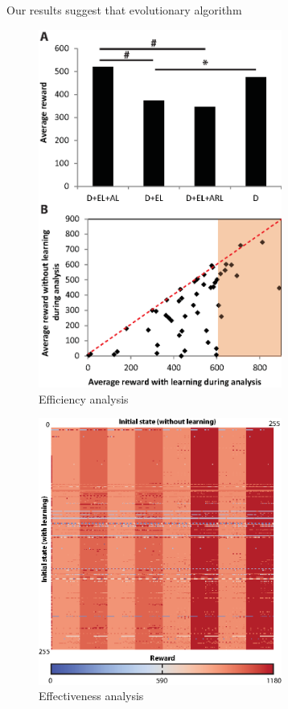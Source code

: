 \documentclass[letterpaper]{article}
\begin{document}
Our results suggest that evolutionary algorithm  

\begin{figure}[!t]
\begin{center}
\includegraphics[width=8cm]{Fig2_Efficiency_analysis.eps}
\caption{Efficiency analysis}
\label{Efficiency_analysis}
\end{center}
\end{figure}

\begin{figure}[!b]
\begin{center}
\includegraphics[width=8cm]{Fig5.eps}
\caption{Effectiveness analysis}
\label{Effectiveness_analysis}
\end{center}
\end{figure}
\end{document}
